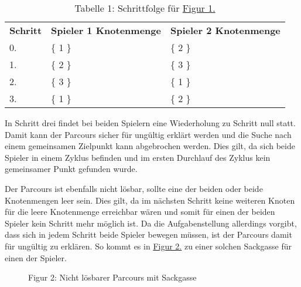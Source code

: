 \documentclass[a4paper,10pt,ngerman]{scrartcl}
\begin{document}
    \begin{table}
        \centering
        \begin{tabular}{lll}
            \textbf{Schritt} & \textbf{Spieler 1 Knotenmenge} & \textbf{Spieler 2 Knotenmenge} \\
            0.               & \{ 1 \}                        & \{ 2 \}                        \\
            1.               & \{ 2 \}                        & \{ 3 \}                        \\
            2.               & \{ 3 \}                        & \{ 1 \}                        \\
            3.               & \{ 1 \}                        & \{ 2 \}                        \\
        \end{tabular}
        \caption{Tabelle 1: Schrittfolge für \hyperref[fig:Figure1]{Figur 1.}}
        \label{tab:Table1}
    \end{table}

    In Schritt drei findet bei beiden Spielern eine Wiederholung zu Schritt null statt.
    Damit kann der Parcours sicher für ungültig erklärt werden
    und die Suche nach einem gemeinsamen Zielpunkt kann abgebrochen werden.
    Dies gilt, da sich beide Spieler in einem Zyklus befinden
    und im ersten Durchlauf des Zyklus kein gemeinsamer Punkt gefunden wurde.

    Der Parcours ist ebenfalls nicht lösbar, sollte eine der beiden oder beide Knotenmengen leer sein.
    Dies gilt, da im nächsten Schritt keine weiteren Knoten für die leere Knotenmenge erreichbar wären
    und somit für einen der beiden Spieler kein Schritt mehr möglich ist.
    Da die Aufgabenstellung allerdings vorgibt, dass sich in jedem Schritt beide Spieler bewegen müssen,
    ist der Parcours damit für ungültig zu erklären.
    So kommt es in \hyperref[fig:Figure2]{Figur 2.} zu einer solchen Sackgasse für einen der Spieler.

    \begin{figure}[!h]
        \centering
        \FigurZwei{}
        \caption{Figur 2: Nicht lösbarer Parcours mit Sackgasse}
        \label{fig:Figure2}
    \end{figure}
\end{document}
